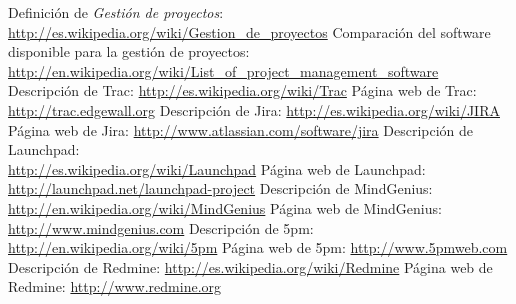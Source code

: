 \documentclass[11pt,a4paper,spanish,twoside]{report}
\begin{document}
\begin{thebibliography}{99}
 Definición de \emph{Gestión de proyectos}:
\\ \url{http://es.wikipedia.org/wiki/Gestion_de_proyectos}
 Comparación del software disponible para la gestión de proyectos:
\\ \url{http://en.wikipedia.org/wiki/List_of_project_management_software}
 Descripción de Trac:
  \url{http://es.wikipedia.org/wiki/Trac}
 Página web de Trac:
  \url{http://trac.edgewall.org}
 Descripción de Jira:
  \url{http://es.wikipedia.org/wiki/JIRA}
 Página web de Jira:
  \url{http://www.atlassian.com/software/jira}
 Descripción de Launchpad:\\
  \url{http://es.wikipedia.org/wiki/Launchpad}
 Página web de Launchpad:\\
  \url{http://launchpad.net/launchpad-project}
 Descripción de MindGenius:\\
  \url{http://en.wikipedia.org/wiki/MindGenius}
 Página web de MindGenius:
  \url{http://www.mindgenius.com}
 Descripción de 5pm:
  \url{http://en.wikipedia.org/wiki/5pm}
 Página web de 5pm:
  \url{http://www.5pmweb.com}
 Descripción de Redmine:
  \url{http://es.wikipedia.org/wiki/Redmine}
 Página web de Redmine:
  \url{http://www.redmine.org}
\end{thebibliography}
\end{document}
